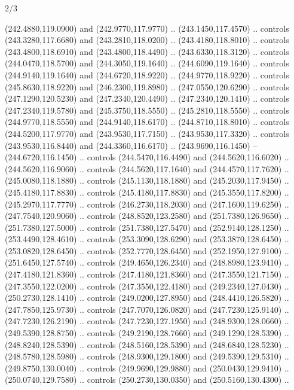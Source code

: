 \begin{flagdescription}{2/3}
\begin{scope}[xshift=0.5\flaglength,yshift=0.5\flagwidth,scale=\flagwidth/259.2]
\begin{scope}[y=0.8pt, x=0.8pt, yscale=-1,shift={(-243,-162)}]
      (242.4880,119.0900) and (242.9770,117.9770) .. (243.1450,117.4570) .. controls
      (243.3280,117.6680) and (243.2810,118.0200) .. (243.4180,118.8010) .. controls
      (243.4800,118.6910) and (243.4800,118.4490) .. (243.6330,118.3120) .. controls
      (244.0470,118.5700) and (244.3050,119.1640) .. (244.6090,119.1640) .. controls
      (244.9140,119.1640) and (244.6720,118.9220) .. (244.9770,118.9220) .. controls
      (245.8630,118.9220) and (246.2300,119.8980) .. (247.0550,120.6290) .. controls
      (247.1290,120.5230) and (247.2340,120.4490) .. (247.2340,120.1410) .. controls
      (247.2340,119.5780) and (245.3750,118.5550) .. (245.2810,118.5550) .. controls
      (244.9770,118.5550) and (244.9140,118.6170) .. (244.8710,118.8010) .. controls
      (244.5200,117.9770) and (243.9530,117.7150) .. (243.9530,117.3320) .. controls
      (243.9530,116.8440) and (244.3360,116.6170) .. (243.9690,116.1450) --
      (244.6720,116.1450) .. controls (244.5470,116.4490) and (244.5620,116.6020) ..
      (244.5620,116.9060) .. controls (244.5620,117.1640) and (244.4570,117.7620) ..
      (245.0080,118.1880) .. controls (245.1130,118.1880) and (245.2030,117.9450) ..
      (245.4180,117.8830) .. controls (245.4180,117.8830) and (245.3550,117.8200) ..
      (245.2970,117.7770) .. controls (246.2730,118.2030) and (247.1600,119.6250) ..
      (247.7540,120.9060) .. controls (248.8520,123.2580) and (251.7380,126.9650) ..
      (251.7380,127.5000) .. controls (251.7380,127.5470) and (252.9140,128.1250) ..
      (253.4490,128.4610) .. controls (253.3090,128.6290) and (253.3870,128.6450) ..
      (253.0820,128.6450) .. controls (252.7770,128.6450) and (252.1950,127.9100) ..
      (251.6450,127.5740) .. controls (249.4650,126.2340) and (248.8980,123.9410) ..
      (247.4180,121.8360) .. controls (247.4180,121.8360) and (247.3550,121.7150) ..
      (247.3550,122.0200) .. controls (247.3550,122.4180) and (249.2340,127.0430) ..
      (250.2730,128.1410) .. controls (249.0200,127.8950) and (248.4410,126.5820) ..
      (247.7850,125.9730) .. controls (247.7070,126.0820) and (247.7230,125.9140) ..
      (247.7230,126.2190) .. controls (247.7230,127.1950) and (248.9300,128.0660) ..
      (249.5390,128.8750) .. controls (249.2190,128.7660) and (249.1290,128.5390) ..
      (248.8240,128.5390) .. controls (248.5160,128.5390) and (248.6840,128.5230) ..
      (248.5780,128.5980) .. controls (248.9300,129.1800) and (249.5390,129.5310) ..
      (249.8750,130.0040) .. controls (249.9690,129.9880) and (250.0430,129.9410) ..
      (250.0740,129.7580) .. controls (250.2730,130.0350) and (250.5160,130.4300) ..

\end{scope}
\end{scope}
\end{flagdescription}
